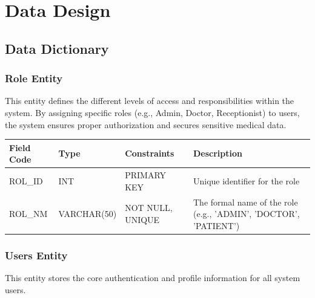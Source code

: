 \section{Data Design}
\subsection{Data Dictionary}
\subsubsection{Role Entity}
This entity defines the different levels of access and responsibilities within the system. By assigning specific roles (e.g., Admin, Doctor, Receptionist) to users, the system ensures proper authorization and secures sensitive medical data.
\begin{table}[H]
	\centering
	\small
	\renewcommand{\arraystretch}{1.4}
	\begin{tabularx}{\textwidth}{l l l X}
		\toprule
		\rowcolor[gray]{0.9} \textbf{Field Code} & \textbf{Type} & \textbf{Constraints} & \textbf{Description} \\
		\midrule
		ROL\_ID & INT & PRIMARY KEY & Unique identifier for the role \\
		ROL\_NM & VARCHAR(50) & NOT NULL, UNIQUE & The formal name of the role (e.g., 'ADMIN', 'DOCTOR', 'PATIENT') \\
		\bottomrule
	\end{tabularx}
\end{table}
\subsubsection{Users Entity}
This entity stores the core authentication and profile information for all system users.


